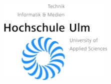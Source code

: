 \documentclass[11pt,twoside,a4paper]{book}
\begin{document}
\newtheorem{lemma}{Lemma}
\newtheorem{definition}{Definition}

\newcommand{\mydate}{\formatdate{3}{4}{2017}} 	

\def\QED{~\rule[-1pt]{5pt}{5pt}\par\medskip}
\newenvironment{proof}{{\noindent \it Proof: \ }}{ \hfill \QED}

\def\HORZTOP{\rule{\linewidth}{0.4mm}\\[3ex]}

\def\HORZBOT{\\[1ex]\rule{\linewidth}{0.4mm}}

\setcounter{totalnumber}{5}		%
\setcounter{tocdepth}{3}		%
\setcounter{secnumdepth}{3}		%

\pagestyle{empty}

\begin{figure}[h]
\flushright
\includegraphics[height=4.0cm]{logo3_klein.jpg}
\end{figure}

\vspace*{3cm}
\end{document}
